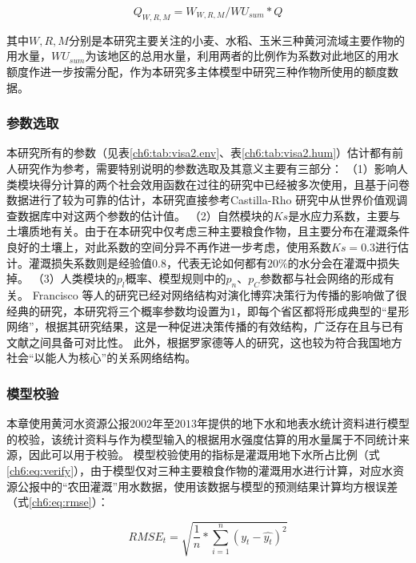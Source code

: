 \begin{equation}
    Q_{W, R, M} = W_{W, R, M} / WU_{sum} * Q
\end{equation}

其中$W, R, M$分别是本研究主要关注的小麦、水稻、玉米三种黄河流域主要作物的用水量，$WU_{sum}$为该地区的总用水量，利用两者的比例作为系数对此地区的用水额度作进一步按需分配，作为本研究多主体模型中研究三种作物所使用的额度数据。



\subsubsection{参数选取}

本研究所有的参数（见表\ref{ch6:tab:visa2.env}、表\ref{ch6:tab:visa2.hum}）估计都有前人研究作为参考，需要特别说明的参数选取及其意义主要有三部分：
（1）影响人类模块得分计算的两个社会效用函数在过往的研究中已经被多次使用，且基于问卷数据进行了较为可靠的估计，本研究直接参考Castilla-Rho 研究中从世界价值观调查数据库中对这两个参数的估计值\cite{castilla-rho2015, castilla-rho2017, castilla-rho2020}。
（2）自然模块的$Ks$是水应力系数，主要与土壤质地有关。由于在本研究中仅考虑三种主要粮食作物，且主要分布在灌溉条件良好的土壤上，对此系数的空间分异不再作进一步考虑，使用系数$Ks = 0.3$进行估计。灌溉损失系数则是经验值$0.8$，代表无论如何都有$20\%$的水分会在灌溉中损失掉。
（3）人类模块的$p_l$概率、模型规则中的$p_n$、$p_C$参数都与社会网络的形成有关。
Francisco 等人的研究已经对网络结构对演化博弈决策行为传播的影响做了很经典的研究\cite{santos2008}，本研究将三个概率参数均设置为$1$，即每个省区都将形成典型的“星形网络”，根据其研究结果，这是一种促进决策传播的有效结构，广泛存在且与已有文献之间具备可对比性\cite{santos2008}。
此外，根据罗家德等人的研究，这也较为符合我国地方社会“以能人为核心”的关系网络结构\cite{luojiade2013}。

\subsubsection{模型校验}

本章使用黄河水资源公报$2002$年至$2013$年提供的地下水和地表水统计资料进行模型的校验，该统计资料与作为模型输入的根据用水强度估算的用水量属于不同统计来源，因此可以用于校验。
模型校验使用的指标是灌溉用地下水所占比例（式\ref{ch6:eq:verify}），由于模型仅对三种主要粮食作物的灌溉用水进行计算，对应水资源公报中的“农田灌溉”用水数据，使用该数据与模型的预测结果计算均方根误差（式\ref{ch6:eq:rmse}）：

\begin{equation}
    \label{ch6:eq:rmse}
    RMSE_t = \sqrt{\frac{1}{n}*\sum_{i=1}^{n}{(y_t - \hat{y_t})}^2}
\end{equation}

